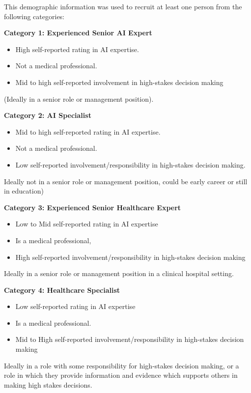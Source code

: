 \documentclass[manuscript,screen,review]{acmart}
\begin{document}
This demographic information was used to recruit at least one person from the following categories:

\textbf{Category 1: Experienced Senior AI Expert}
\begin{itemize}
\item High self-reported rating in AI expertise.
\item Not a medical professional.
\item Mid to high self-reported involvement in high-stakes decision making
\end{itemize}
(Ideally in a senior role or management position).

\textbf{Category 2: AI Specialist}
\begin{itemize}
\item Mid to high self-reported rating in AI expertise.
\item Not a medical professional.
\item Low self-reported involvement/responsibility in high-stakes decision making.
\end{itemize}

Ideally not in a senior role or management position, could be early career or still in education)

\textbf{Category 3: Experienced Senior Healthcare Expert}
\begin{itemize}
\item Low to Mid self-reported rating in AI expertise
\item Is a medical professional, 
\item High self-reported involvement/responsibility in high-stakes decision making
\end{itemize}

Ideally in a senior role or management position in a clinical hospital setting.

\textbf{Category 4: Healthcare Specialist}
\begin{itemize}
\item Low self-reported rating in AI expertise
\item Is a medical professional.
\item Mid to High self-reported involvement/responsibility in high-stakes decision making
\end{itemize}

Ideally in a role with some responsibility for high-stakes decision making, or a role in which they provide information and evidence which supports others in making high stakes decisions. 
\end{document}
